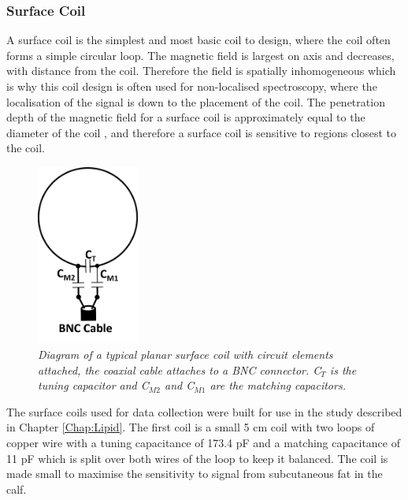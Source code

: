 \subsubsection{Surface Coil}
\label{Chap:Theory:Coils}

A surface coil is the simplest and most basic coil to design, where the coil often forms a simple circular loop. The magnetic field is largest on axis and decreases, with distance from the coil. Therefore the field is spatially inhomogeneous which is why this coil design is often used for non-localised spectroscopy, where the localisation of the signal is down to the placement of the coil. The penetration depth of the magnetic field for a surface coil is approximately equal to the diameter of the coil \cite{Gruber2018RFNonphysicists}, and therefore a surface coil is sensitive to regions closest to the coil. 

\begin{figure}
    \centering
    \includegraphics[width=0.3\textwidth]{Figures/Theory/Surface_Coil.png}
    \caption{\textit{Diagram of a typical planar surface coil with circuit elements attached, the coaxial cable attaches to a BNC connector. C$_T$ is the tuning capacitor and C$_{M2}$ and C$_{M1}$ are the matching capacitors.}}
    \label{fig:theory:Surface}
\end{figure}

The surface coils used for data collection were built for use in the study described in Chapter \ref{Chap:Lipid}. The first coil is a small 5 cm coil with two loops of copper wire with a tuning capacitance of 173.4 pF and a matching capacitance of 11 pF which is split over both wires of the loop to keep it balanced. The coil is made small to maximise the sensitivity to signal from subcutaneous fat in the calf.

